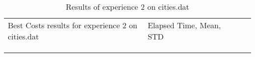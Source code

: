 	\begin{minipage}[t]{0.9\linewidth}
	\vspace{-10mm}
	\begin{table}[H]
	\label{tab:PathofcitiesNvariation:expdeux}
	\begin{tabular}{lllll}
	\cline{1-2}
	\multicolumn{1}{|l|}{Best Costs results for experience 2 on cities.dat }                                                           &  \multicolumn{1}{l|}{Elapsed Time, Mean, STD}                                             &  &  &  \\ \cline{1-2}
	\multicolumn{1}{|l|}{} & \multicolumn{1}{l|}{ } &  &  &  \\ \cline{1-2}
	&     &  &  &  \\
	&     &  &  & 
	\end{tabular}
	\caption{Results of experience 2 on cities.dat}
	\end{table}
	\end{minipage}

